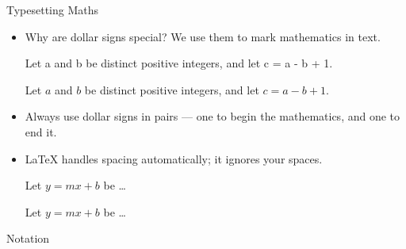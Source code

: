 \documentclass[10pt,times]{beamer}
\begin{document}
\begin{frame}[fragile]{Typesetting Maths}
\begin{itemize}
\item Why are dollar signs \keys{\$} special? We use them to mark mathematics 
in text.\\[1ex]
\begin{exampletwouptiny}
Let a and b be distinct positive
integers, and let c = a - b + 1.

Let $a$ and $b$ be distinct positive
integers, and let $c = a - b + 1$.
\end{exampletwouptiny}
\item Always use dollar signs in pairs --- one to begin the mathematics, and one
to end it.
\item \LaTeX{} handles spacing automatically; it ignores your spaces.
\begin{exampletwouptiny}
Let $y=mx+b$ be \ldots

Let $y = m x + b$ be \ldots
\end{exampletwouptiny}

\end{itemize}
\end{frame}

\begin{frame}[fragile]{Notation}
\end{frame}
\end{document}
